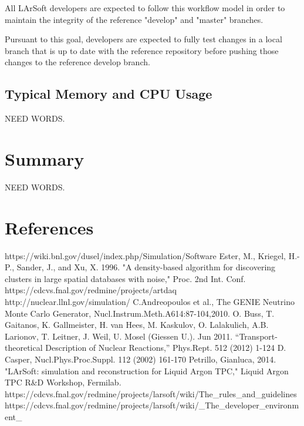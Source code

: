\documentclass[12pt]{elsarticle}
\begin{document}
All LArSoft developers are expected to follow this workflow model in order to maintain the integrity of the reference "develop" and "master" branches.

Pursuant to this goal, developers are expected to fully test changes in a local branch that is up to date with the reference repository before pushing those changes to the reference develop branch. 
\subsection{Typical Memory and CPU Usage}
NEED WORDS.

\section{Summary}
NEED WORDS.
\section{References}

\begin{thebibliography}{99}
 https://wiki.bnl.gov/dusel/index.php/Simulation/Software
 Ester, M., Kriegel, H.-P., Sander, J., and Xu, X. 1996. "A density-based algorithm for discovering clusters in large spatial databases with noise," Proc. 2nd Int. Conf.
 https://cdcvs.fnal.gov/redmine/projects/artdaq
 http://nuclear.llnl.gov/simulation/
 C.Andreopoulos et al., The GENIE Neutrino Monte Carlo Generator, Nucl.Instrum.Meth.A614:87-104,2010.
 O. Buss, T. Gaitanos, K. Gallmeister, H. van Hees, M. Kaskulov, O. Lalakulich, A.B. Larionov, T. Leitner, J. Weil, U. Mosel (Giessen U.). Jun 2011. ``Transport-theoretical Description of Nuclear Reactions,'' Phys.Rept. 512 (2012) 1-124
 D. Casper, Nucl.Phys.Proc.Suppl. 112 (2002) 161-170
 Petrillo, Gianluca, 2014. "LArSoft: simulation and reconstruction for Liquid Argon TPC," Liquid Argon TPC R\&D Workshop, Fermilab.
 https://cdcvs.fnal.gov/redmine/projects/larsoft/wiki/The\_rules\_and\_guidelines
https://cdcvs.fnal.gov/redmine/projects/larsoft/wiki/\_The\_developer\_environment\_
\end{thebibliography}
\clearpage 
\end{document}
